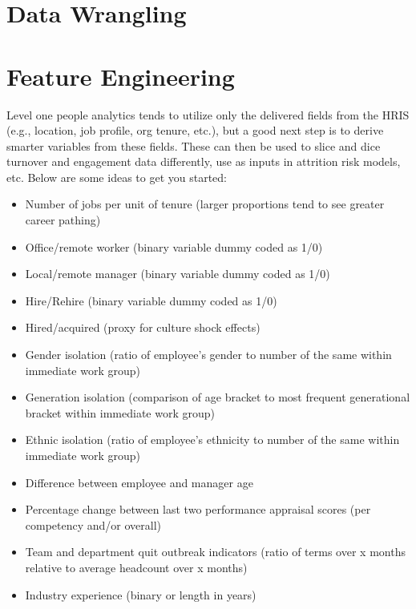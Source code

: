 \documentclass[]{book}
\providecommand{\tightlist}{%
  \setlength{\itemsep}{0pt}\setlength{\parskip}{0pt}}
\begin{document}
\hypertarget{data-wrangling}{%
\section{Data Wrangling}\label{data-wrangling}}

\hypertarget{feature-engineering}{%
\section{Feature Engineering}\label{feature-engineering}}

Level one people analytics tends to utilize only the delivered fields from the HRIS (e.g., location, job profile, org tenure, etc.), but a good next step is to derive smarter variables from these fields. These can then be used to slice and dice turnover and engagement data differently, use as inputs in attrition risk models, etc. Below are some ideas to get you started:

\begin{itemize}
\tightlist
\item
  Number of jobs per unit of tenure (larger proportions tend to see greater career pathing)
\item
  Office/remote worker (binary variable dummy coded as 1/0)
\item
  Local/remote manager (binary variable dummy coded as 1/0)
\item
  Hire/Rehire (binary variable dummy coded as 1/0)
\item
  Hired/acquired (proxy for culture shock effects)
\item
  Gender isolation (ratio of employee's gender to number of the same within immediate work
  group)
\item
  Generation isolation (comparison of age bracket to most frequent generational bracket within
  immediate work group)
\item
  Ethnic isolation (ratio of employee's ethnicity to number of the same within immediate work
  group)
\item
  Difference between employee and manager age
\item
  Percentage change between last two performance appraisal scores (per competency and/or
  overall)
\item
  Team and department quit outbreak indicators (ratio of terms over x months relative to average
  headcount over x months)
\item
  Industry experience (binary or length in years)
\end{itemize}
\end{document}

